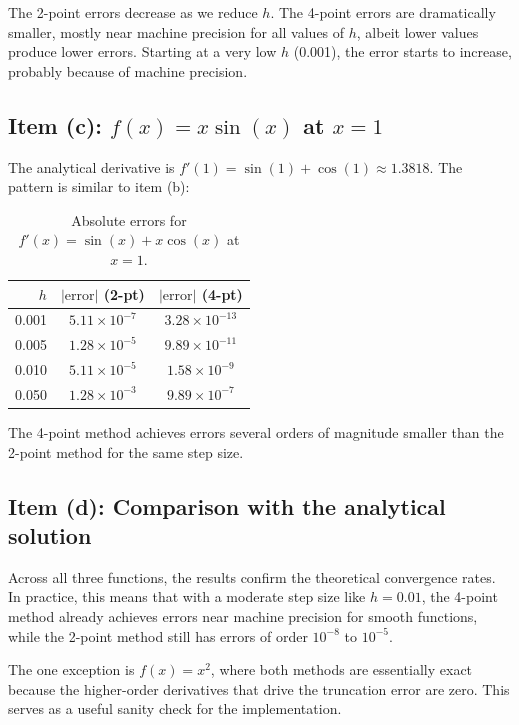 \documentclass{article}
\begin{document}
The 2-point errors decrease as we reduce $h$. The 4-point errors are dramatically smaller, mostly near machine precision for all values of $h$, albeit lower values produce lower errors. Starting at a very low $h$ (0.001), the error starts to increase, probably because of machine precision.

\subsection*{Item (c): $f(x) = x\sin(x)$ at $x = 1$}

The analytical derivative is $f'(1) = \sin(1) + \cos(1) \approx 1.3818$. The pattern is similar to item (b):

\begin{table}[h!]
\centering
\begin{tabular}{rcc}
    \toprule
    $h$ & $|\text{error}|$ (2-pt) & $|\text{error}|$ (4-pt) \\
    \midrule
    0.001 & $5.11 \times 10^{-7}$  & $3.28 \times 10^{-13}$ \\
    0.005 & $1.28 \times 10^{-5}$  & $9.89 \times 10^{-11}$ \\
    0.010 & $5.11 \times 10^{-5}$  & $1.58 \times 10^{-9}$  \\
    0.050 & $1.28 \times 10^{-3}$  & $9.89 \times 10^{-7}$  \\
    \bottomrule
\end{tabular}
\caption{Absolute errors for $f'(x) = \sin(x) + x\cos(x)$ at $x=1$.}
\label{tab:q5_xsinx}
\end{table}

The 4-point method achieves errors several orders of magnitude smaller than the 2-point method for the same step size.

\subsection*{Item (d): Comparison with the analytical solution}

Across all three functions, the results confirm the theoretical convergence rates. In practice, this means that with a moderate step size like $h = 0.01$, the 4-point method already achieves errors near machine precision for smooth functions, while the 2-point method still has errors of order $10^{-8}$ to $10^{-5}$.

The one exception is $f(x) = x^2$, where both methods are essentially exact because the higher-order derivatives that drive the truncation error are zero. This serves as a useful sanity check for the implementation.
\end{document}
